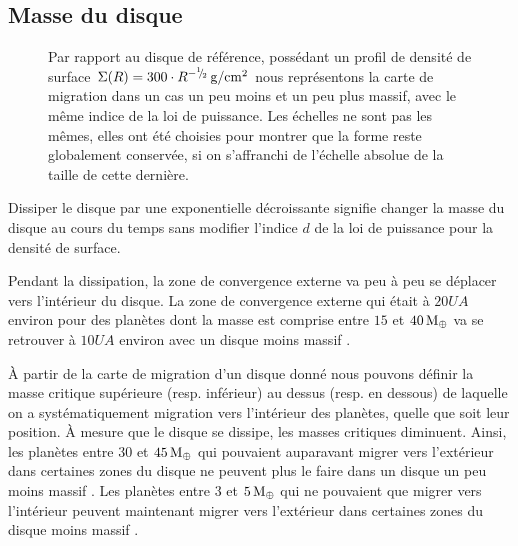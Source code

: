 \subsection{Masse du disque}
\begin{figure}[htb]
\centering
{}\hfill
{}

\caption{Par rapport au disque de référence, possédant un profil de densité de surface $\Sigma(R) = 300 \cdot R^{-{{}^{1\!\!}/ _{\!2}}}\mathrm{\thinspace g/cm^2}$ nous représentons la carte de migration dans un cas un peu moins et un peu plus massif, avec le même indice de la loi de puissance. Les échelles ne sont pas les mêmes, elles ont été choisies pour montrer que la forme reste globalement conservée, si on s'affranchi de l'échelle absolue de la taille de cette dernière.}\label{fig:map_total_mass}
\end{figure}

Dissiper le disque par une exponentielle décroissante signifie changer la masse du disque au cours du temps sans modifier l'indice $d$ de la loi de puissance pour la densité de surface.

Pendant la dissipation, la zone de convergence externe va peu à peu se déplacer vers l'intérieur du disque. La zone de convergence externe qui était à $20\unit{UA}$ environ pour des planètes dont la masse est comprise entre $15$ et $40\mathrm{\thinspace M_\oplus}$  va se retrouver à $10\unit{UA}$ environ avec un disque moins massif . 

À partir de la carte de migration d'un disque donné nous pouvons définir la masse critique supérieure (resp. inférieur) au dessus (resp. en dessous) de laquelle on a systématiquement migration vers l'intérieur des planètes, quelle que soit leur position. À mesure que le disque se dissipe,  les masses critiques diminuent. Ainsi, les planètes entre $30$ et $45\mathrm{\thinspace M_\oplus}$ qui pouvaient auparavant migrer vers l'extérieur dans certaines zones du disque  ne peuvent plus le faire dans un disque un peu moins massif . Les planètes entre $3$ et $5\mathrm{\thinspace M_\oplus}$ qui ne pouvaient que migrer vers l'intérieur  peuvent maintenant migrer vers l'extérieur dans certaines zones du disque moins massif . 

